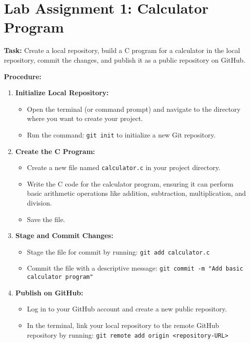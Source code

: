 \documentclass{article}
\begin{document}
\newpage

\tableofcontents

\newpage

\section{Lab Assignment 1: Calculator Program}

\textbf{Task:} Create a local repository, build a C program for a calculator in the local repository, commit the changes, and publish it as a public repository on GitHub.

\textbf{Procedure:}
\begin{enumerate}
    \item \textbf{Initialize Local Repository:}
    \begin{itemize}
        \item Open the terminal (or command prompt) and navigate to the directory where you want to create your project.
        \item Run the command: \texttt{git init} to initialize a new Git repository.
    \end{itemize}
    \item \textbf{Create the C Program:}
    \begin{itemize}
        \item Create a new file named \texttt{calculator.c} in your project directory.
        \item Write the C code for the calculator program, ensuring it can perform basic arithmetic operations like addition, subtraction, multiplication, and division.
        \item Save the file.
    \end{itemize}
    \item \textbf{Stage and Commit Changes:}
    \begin{itemize}
        \item Stage the file for commit by running: \texttt{git add calculator.c}
        \item Commit the file with a descriptive message: \texttt{git commit -m "Add basic calculator program"}
    \end{itemize}
    \item \textbf{Publish on GitHub:}
    \begin{itemize}
        \item Log in to your GitHub account and create a new public repository.
        \item In the terminal, link your local repository to the remote GitHub repository by running: \texttt{git remote add origin <repository-URL>}

\end{itemize}
\end{enumerate}
\end{document}
